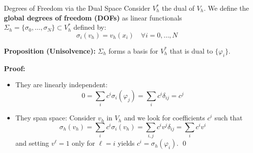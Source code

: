 \documentclass[aspectratio=169]{beamer}
\begin{document}
\begin{frame}{Degrees of Freedom via the Dual Space}
    Consider $V_h^*$ the dual of $V_h$. We define the \textbf{global degrees of freedom (DOFs)} as linear functionals $\Sigma_h = \{\sigma_0, \dots, \sigma_N\} \subset V_h^*$ defined by:
    $$ \sigma_i(v_h) = v_h(x_i) \quad \forall i=0,\dots,N $$

    \textbf{Proposition (Unisolvence):} $\Sigma_h$ forms a basis for $V_h^*$ that is dual to $\{\varphi_i\}$.

    \textbf{Proof:} \pause
    \begin{itemize}[<+->]
        \item They are linearly independent: 
            $$ 0 = \sum_i c^i\sigma_i(\varphi_j) = \sum_i c^i \delta_{ij} = c^j $$
        \item They span space: Consider $v_h$ in $V_h$ and we look for coefficients $c^i$ such that
            $$ \sigma_h(v_h) = \sum_i c^i \sigma_i(v_h) = \sum_{i,j} c^i v^j \delta_{ij} = \sum_{i} c^i v^i $$
            and setting $v^\ell = 1$ only for $\ell=i$ yields $c^i = \sigma_h(\varphi_i)$.  \qed
    \end{itemize}
\end{frame}
\end{document}
